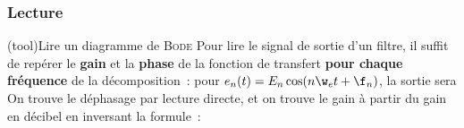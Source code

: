 \documentclass[../../main/main.tex]{subfiles}
\begin{document}
\subsubsection{Lecture}
\begin{tcb*}[breakable](tool){Lire un diagramme de \textsc{Bode}}
	Pour lire le signal de sortie d'un filtre, il suffit de repérer le \textbf{gain}
	et la \textbf{phase} de la fonction de transfert \textbf{pour chaque fréquence}
	de la décomposition~: pour $e_n(t) = E_n \cos(n\w_et + \f_n)$, la sortie sera
	\psw{%
		\[
			s_n(t) = G(n\w_e) E_n \cos(\wt + \f_n + \arg*{\Hu(n\w_e)})
		\]
	}
	On trouve le déphasage par lecture directe, et on trouve le gain à partir du
	gain en décibel en inversant la formule~:
	\psw{%
		\[
			G\ind{dB}(\w) = 20 \log G(\w)
			\Lra
			G(\w) = 10^{G\ind{dB}(\w)/20}
		\]
	}
	\vspace{-15pt}
\end{tcb*}

\end{document}
